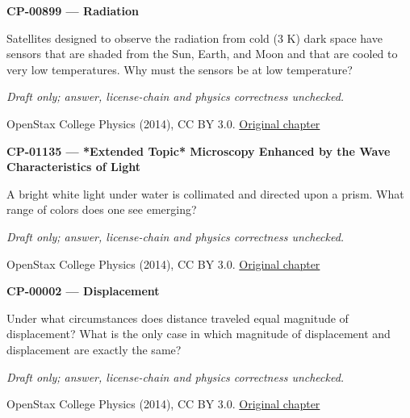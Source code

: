 \par\medskip
\noindent\textbf{CP-00899 — Radiation}
\par Satellites designed to observe the radiation from cold (3 K) dark space have sensors that are shaded from the Sun, Earth, and Moon and that are cooled to very low temperatures. Why must the sensors be at low temperature?
\par\smallskip
\textit{Draft only; answer, license-chain and physics correctness unchecked.}
\par{\footnotesize OpenStax College Physics (2014), CC BY 3.0. \href{https://github.com/philschatz/physics-book/blob/a7efaa7e221fab1694022d8bb98b83a73ee31d3d/contents/m42230.md}{Original chapter}}\par\normalsize

\par\medskip
\noindent\textbf{CP-01135 — *Extended Topic* Microscopy Enhanced by the Wave Characteristics of Light}
\par A bright white light under water is collimated and directed upon a prism. What range of colors does one see emerging?
\par\smallskip
\textit{Draft only; answer, license-chain and physics correctness unchecked.}
\par{\footnotesize OpenStax College Physics (2014), CC BY 3.0. \href{https://github.com/philschatz/physics-book/blob/a7efaa7e221fab1694022d8bb98b83a73ee31d3d/contents/m42290.md}{Original chapter}}\par\normalsize

\par\medskip
\noindent\textbf{CP-00002 — Displacement}
\par Under what circumstances does distance traveled equal magnitude of displacement? What is the only case in which magnitude of displacement and displacement are exactly the same?
\par\smallskip
\textit{Draft only; answer, license-chain and physics correctness unchecked.}
\par{\footnotesize OpenStax College Physics (2014), CC BY 3.0. \href{https://github.com/philschatz/physics-book/blob/a7efaa7e221fab1694022d8bb98b83a73ee31d3d/contents/m42033.md}{Original chapter}}\par\normalsize

